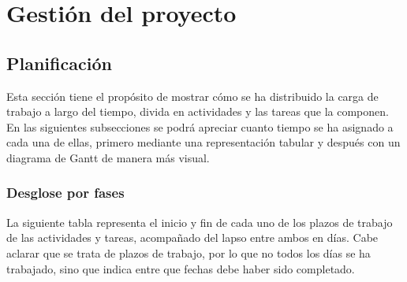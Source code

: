 \chapter{Gestión del proyecto}
\label{ch:gestion}
\section{Planificación}
Esta sección tiene el propósito de mostrar cómo se ha distribuido la carga de trabajo a largo del tiempo, divida en actividades y las tareas que la componen. En las siguientes subsecciones se podrá apreciar cuanto tiempo se ha asignado a cada una de ellas, primero mediante una representación tabular y después con un diagrama de Gantt de manera más visual.

\subsection{Desglose por fases}
La siguiente tabla representa el inicio y fin de cada uno de los plazos de trabajo de las actividades y tareas, acompañado del lapso entre ambos en días. Cabe aclarar que se trata de plazos de trabajo, por lo que no todos los días se ha trabajado, sino que indica entre que fechas debe haber sido completado.

